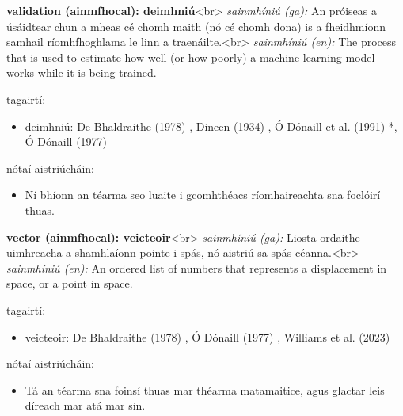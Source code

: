\documentclass{article}
\begin{document}
\textbf{validation (ainmfhocal): deimhniú}<br>
\textit{sainmhíniú (ga):} An próiseas a úsáidtear chun a mheas cé chomh maith (nó cé chomh dona) is a fheidhmíonn samhail ríomhfhoghlama le linn a traenáilte.<br>
\textit{sainmhíniú (en):} The process that is used to estimate how well (or how poorly) a machine learning model works while it is being trained.

tagairtí:
\begin{itemize}
	\item deimhniú: De Bhaldraithe (1978) \cite{de-bhaldraithe}, Dineen (1934) \cite{dineen}, Ó Dónaill et al. (1991) \cite{focloir-beag}*, Ó Dónaill (1977) \cite{odonaill}
\end{itemize}

nótaí aistriúcháin:
\begin{itemize}
	\item Ní bhíonn an téarma seo luaite i gcomhthéacs ríomhaireachta sna foclóirí thuas.
\end{itemize}


\textbf{vector (ainmfhocal): veicteoir}<br>
\textit{sainmhíniú (ga):} Liosta ordaithe uimhreacha a shamhlaíonn pointe i spás, nó aistriú sa spás céanna.<br>
\textit{sainmhíniú (en):} An ordered list of numbers that represents a displacement in space, or a point in space.

tagairtí:
\begin{itemize}
	\item veicteoir: De Bhaldraithe (1978) \cite{de-bhaldraithe}, Ó Dónaill (1977) \cite{odonaill}, Williams et al. (2023) \cite{storchiste}
\end{itemize}

nótaí aistriúcháin:
\begin{itemize}
	\item Tá an téarma sna foinsí thuas mar théarma matamaitice, agus glactar leis díreach mar atá mar sin.
\end{itemize}



            \printbibliography[title={Tagairtí}]
            
\end{document}
